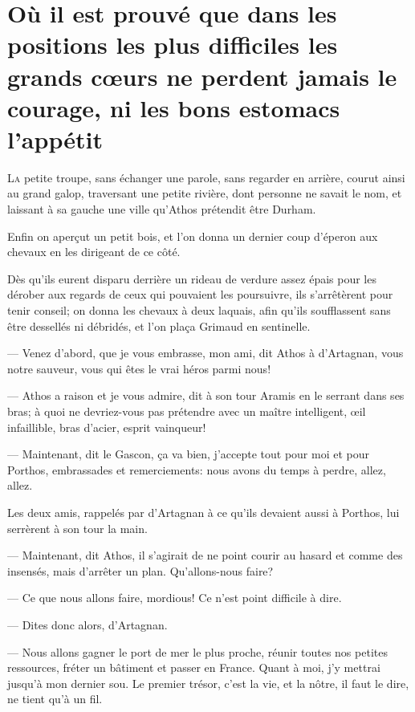 \chapter[Les grands cœurs ne perdent jamais le courage]{Où il est prouvé que dans les positions les plus difficiles les grands cœurs ne perdent jamais le courage, ni les bons estomacs l'appétit}

\lettrine{L}{a} petite troupe, sans échanger une parole, sans regarder en arrière, courut ainsi au grand galop, traversant une petite rivière, dont personne ne savait le nom, et laissant à sa gauche une ville qu'Athos prétendit être Durham.

\zz
Enfin on aperçut un petit bois, et l'on donna un dernier coup d'éperon aux chevaux en les dirigeant de ce côté.

Dès qu'ils eurent disparu derrière un rideau de verdure assez épais pour les dérober aux regards de ceux qui pouvaient les poursuivre, ils s'arrêtèrent pour tenir conseil; on donna les chevaux à deux laquais, afin qu'ils soufflassent sans être dessellés ni débridés, et l'on plaça Grimaud en sentinelle.

— Venez d'abord, que je vous embrasse, mon ami, dit Athos à d'Artagnan, vous notre sauveur, vous qui êtes le vrai héros parmi nous!

— Athos a raison et je vous admire, dit à son tour Aramis en le serrant dans ses bras; à quoi ne devriez-vous pas prétendre avec un maître intelligent, œil infaillible, bras d'acier, esprit vainqueur!

— Maintenant, dit le Gascon, ça va bien, j'accepte tout pour moi et pour Porthos, embrassades et remerciements: nous avons du temps à perdre, allez, allez.

Les deux amis, rappelés par d'Artagnan à ce qu'ils devaient aussi à Porthos, lui serrèrent à son tour la main.

— Maintenant, dit Athos, il s'agirait de ne point courir au hasard et comme des insensés, mais d'arrêter un plan. Qu'allons-nous faire?

— Ce que nous allons faire, mordious! Ce n'est point difficile à dire.

— Dites donc alors, d'Artagnan.

— Nous allons gagner le port de mer le plus proche, réunir toutes nos petites ressources, fréter un bâtiment et passer en France. Quant à moi, j'y mettrai jusqu'à mon dernier sou. Le premier trésor, c'est la vie, et la nôtre, il faut le dire, ne tient qu'à un fil.

